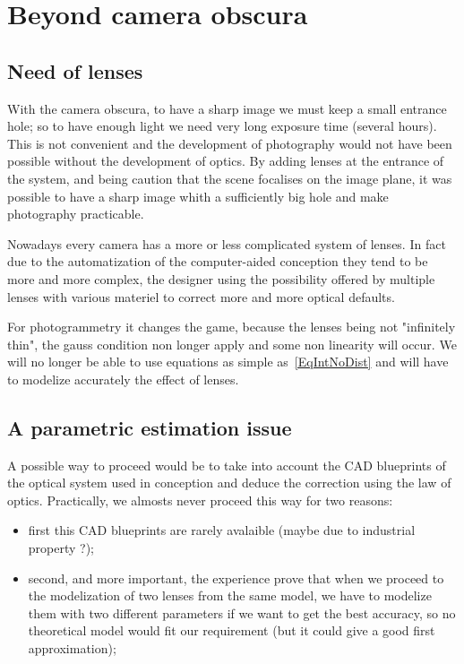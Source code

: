 
\section{Beyond camera obscura}

\subsection{Need of lenses}

With the camera obscura, to have a sharp image we must keep a small entrance hole;
so to have enough light we need very long exposure time (several hours). 
This is not convenient and the development of photography
would not have been possible without the development of optics. By adding
lenses at the entrance of the system, and being caution that the  scene focalises
on the image plane, it was possible to have a sharp image whith a sufficiently big
hole and make photography practicable.

Nowadays every camera has a more or less complicated system of lenses. In fact due to the
automatization of the computer-aided conception they tend to be more and more complex, the designer
using the possibility offered by multiple lenses with various materiel to correct more and more optical defaults.

For photogrammetry it changes the game, because the lenses being not "infinitely thin", the gauss
condition non longer apply and some non linearity will occur. We will no longer be able to use
equations as simple as~\ref{EqIntNoDist} and will have to modelize accurately the effect of
lenses. 


\subsection{A parametric estimation issue}

A possible way to proceed would be to take into account the CAD blueprints of the optical
system used in conception and deduce the correction using the law of optics.  
Practically, we almosts never proceed this way for two reasons:

\begin{itemize}
   \item first this CAD blueprints are rarely avalaible (maybe due to industrial property ?);
   \item second, and more important, the experience prove that when we proceed to the
         modelization of two lenses from the same model, we have to modelize them with two
         different parameters if we want to get the best accuracy, so no theoretical model 
         would fit our requirement (but it could give a good first approximation);
\end{itemize}

